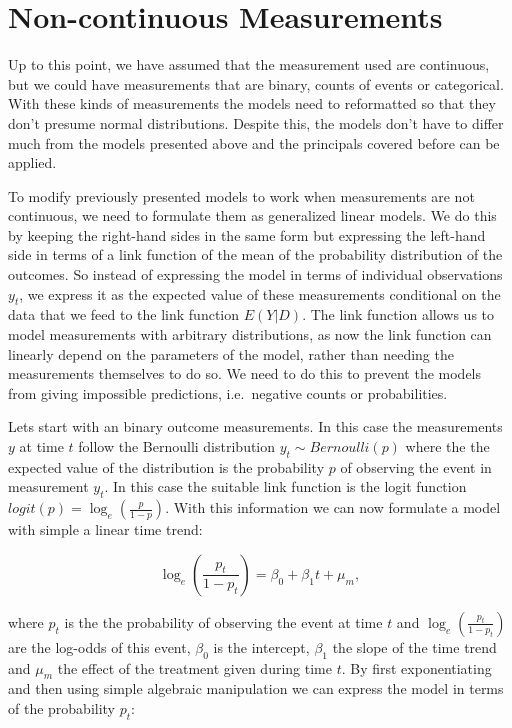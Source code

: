\documentclass[12pt,a4paper,leqno]{report}
\theoremstyle{plain}
\theoremstyle{definition}
\theoremstyle{remark}
\begin{document}
\section{Non-continuous Measurements}\label{noncontinuous}

Up to this point, we have assumed that the measurement used are continuous, but
we could have measurements that are binary, counts of events or
categorical. With these kinds of measurements the models need to reformatted so that
they don't presume normal distributions. Despite this, the models don't
have to differ much from the models presented above and the principals covered
before can be applied.

To modify previously presented models to work when measurements are not
continuous, we need to formulate them as generalized linear models. We do
this by keeping the right-hand sides in the same form but expressing the
left-hand side in terms of a link function of the mean of the probability
distribution of the outcomes. So instead of expressing the model in terms of
individual observations \(y_t\), we express it as the expected value of these
measurements conditional on the data that we feed to the link
function \(E(Y|D)\). The link function allows us to model measurements with arbitrary
distributions, as now the link function can linearly depend on the parameters of
the model, rather than needing the measurements themselves to do so. We need to
do this to prevent the models from giving impossible predictions, i.e.\ negative
counts or probabilities.

Lets start with an binary outcome measurements. In this case the
measurements \(y\) at time \(t\) follow the Bernoulli distribution \(y_t \sim
Bernoulli(p)\) where the the expected value of the distribution is the
probability \(p\) of observing the event in measurement \(y_t\). In this case
the suitable link function is the logit function
\(logit(p)=\log_e(\frac{p}{1-p})\). With this information we can now formulate a
model with simple a linear time trend:

\begin{def}\label{}
    \begin{equation}
        \log_e(\frac{p_t}{1-p_t})=\beta_0 + \beta_1 t + \mu_m,
    \end{equation}
\end{def}where \(p_t\) is the the probability of observing the event at time
\(t\) and \(\log_e(\frac{p_t}{1-p_t})\) are the log-odds of this event,
\(\beta_0\) is the intercept, \(\beta_1\) the slope of the time trend and
\(\mu_m\) the effect of the treatment given during time \(t\). By first
exponentiating and then using simple algebraic manipulation we can
express the model in terms of the probability \(p_t\):
\end{document}
